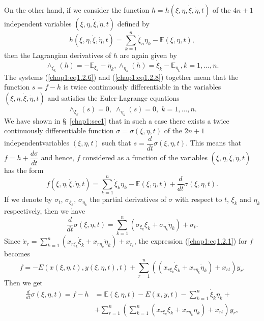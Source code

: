 On the other hand, if we consider the function $h = h (\xi, \eta, \dot{\xi}, \dot{\eta}, t)$ of the $4n+1$ independent variables $(\xi, \eta, \dot{\xi}, \dot{\eta}, t)$ defined by 
\begin{equation*}
h(\xi, \eta, \dot{\xi}, \dot{\eta},t) = \sum\limits^n_{k=1} \dot{\xi}_n \eta_k - \mathbb{E} (\xi, \eta, t), \tag{1.2.7}\label{chap1:eq1.2.7}
\end{equation*}
then the Lagrangian derivatives of $h$ are again given by
\begin{equation*}
\wedge_{\xi_k} (h) = - \mathbb{E}_{\xi_k} - \dot{\eta}_k, \wedge_{\eta_k} (h) = \dot{\xi}_k - \mathbb{E}_{\eta_k}, k = 1, \ldots, n . \tag{1.2.8}\label{chap1:eq1.2.8}
\end{equation*}
The systems (\ref{chap1:eq1.2.6}) and (\ref{chap1:eq1.2.8}) together mean that the function $s = f - h$ is twice continuously differentiable in the variables $(\xi,\eta, \dot{\xi}, \dot{\eta},t)$ and satisfies the Euler-Lagrange equations
$$
\wedge_{\xi_k} (s) = 0, \;\wedge_{\eta_k} (s) = 0,\; k =1 , \ldots, n.
$$
We have shown in \S\ \ref{chap1:sec1} that in such a case there exists a twice continuously differentiable function $\sigma = \sigma (\xi, \eta, t)$ of the $2n+1$ independent\pageoriginale variables $(\xi, \eta, t)$ such that $s = \dfrac{d}{dt} \sigma (\xi, \eta, t)$. This means that $f=h+ \dfrac{d\sigma}{dt}$ and hence, $f$ considered as a function of the variables $(\xi, \eta, \dot{\xi}, \dot{\eta},t)$ has the form 
\begin{equation*}
f(\xi, \eta, \dot{\xi}, \dot{\eta}, t)= \sum\limits^n_{k=1} \dot{\xi}_k \eta_k - \mathbb{E} (\xi, \eta, t) + \frac{d}{dt} \sigma (\xi, \eta, t). \tag{1.2.9}\label{chap1:eq1.2.9}
\end{equation*}
If we denote by $\sigma_t$, $\sigma_{\xi_k}$, $\sigma_{\eta_k}$ the partial derivatives of $\sigma$ with respect to $t$, $\xi_k$ and $\eta_k$ respectively, then we have 
$$
\dfrac{d}{dt} \sigma (\xi, \eta, t) = \sum\limits^n_{k=1} (\sigma_{\xi_k} \dot{\xi}_k + \sigma_{\eta_k} \dot{\eta}_k) + \sigma_t. 
$$
Since $\dot{x}_r = \sum\limits^n_{k=1} (x_{r \xi_k} \dot{\xi}_k + x_{r\eta_k } \dot{\eta}_k) + x_{r_t}$, the expression (\ref{chap1:eq1.2.1}) for $f$ becomes
$$
f = - E (x(\xi, \eta, t), y (\xi, \eta, t), t) + \sum\limits^n_{r=1} ((x_{r\xi_k} \dot{\xi}_k + x_{r\eta_k} \dot{\eta}_k) + x_{rt}) y_r. 
$$
Then we get
\begin{align*}
\frac{d}{dt} \sigma (\xi , \eta, t) = f - h & = \mathbb{E} (\xi , \eta, t) - E(x,y,t) - \sum\limits^n_{k=1} \dot{\xi}_k \eta_k + \\
& + \sum\limits^n_{r=1} \left(\sum\limits^n_{k=1} (x_{r\xi_k} \dot{\xi}_k + x_{r\eta_k} \dot{\eta}_k) + x_{rt} \right) y_r, 
\end{align*}
